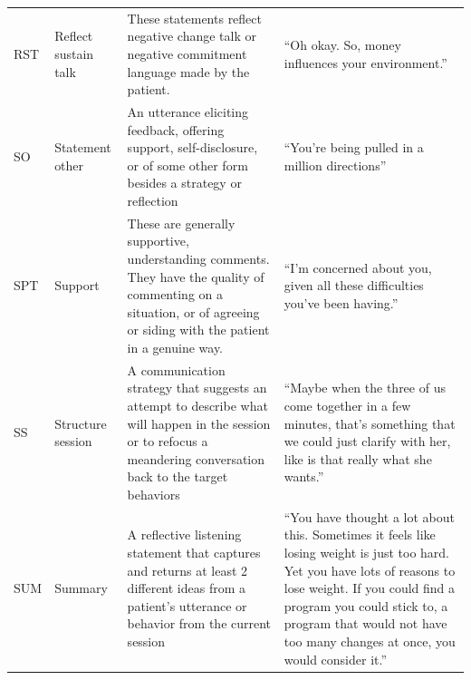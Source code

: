 \documentclass[smallextended]{svjour3}       %
\begin{document}
\begin{small}
\begin{longtable}{p{1.3cm}p{2cm}p{5cm}p{4.8cm}}
RST & Reflect sustain talk & These statements reflect negative change talk or negative commitment language made by the patient. & ``Oh okay.  So, money influences your environment.''\\
SO & Statement other & An utterance eliciting feedback, offering support, self-disclosure, or of some other form besides a strategy or reflection & ``You're being pulled in a million directions''\\
SPT & Support & These are generally supportive, understanding comments. They have the quality of commenting on a situation, or of agreeing or siding with the patient in a genuine way. & ``I'm concerned about you, given all these difficulties you've been having.''\\
SS & Structure session & A communication strategy that suggests an attempt to describe what will happen in the session or to refocus a meandering conversation back to the target behaviors & ``Maybe when the three of us come together in a few minutes, that's something that we could just clarify with her, like is that really what she wants.''\\
SUM & Summary & A reflective listening statement that captures and returns at least 2 different ideas from a patient's utterance or behavior from the current session & ``You have thought a lot about this.  Sometimes it feels like losing weight is just too hard.  Yet you have lots of reasons to lose weight.  If you could find a program you could stick to, a program that would not have too many changes at once, you would consider it.''\\


\end{longtable}
\end{small}
\end{document}
